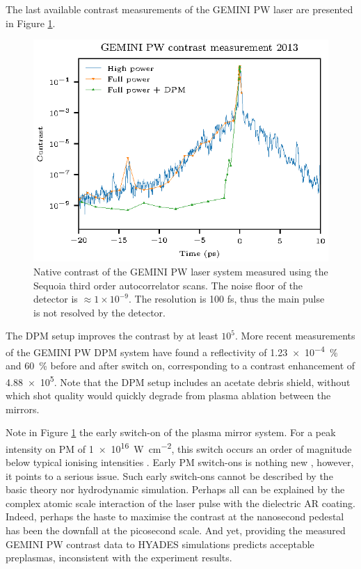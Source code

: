 The last available contrast measurements of the GEMINI PW laser are presented in Figure \ref{fig:geminicontrast}. 
\begin{figure}
	\centering
	\includegraphics{figures/gemini/gemini_contrast}
	\caption[Native contrast of the GEMINI PW laser system.]{Native contrast of the GEMINI PW laser system measured using the Sequoia third order autocorrelator scans. The noise floor of the detector is $\approx 1\times 10^{-9}$. The resolution is 100 fs, thus the main pulse is not resolved by the detector.}
	\label{fig:geminicontrast}
\end{figure}
The \ac{DPM} setup improves the contrast by at least $10^5$. More recent measurements of the GEMINI PW DPM system have found a reflectivity of \qty{1.23e-4}{\%} and \qty{60}{\%} before and after switch on, corresponding to a contrast enhancement of \num{4.88e5}. Note that the DPM setup includes an acetate debris shield, without which shot quality would quickly degrade from plasma ablation between the mirrors.


Note in Figure \ref{fig:geminicontrast} the early switch-on of the plasma mirror system. For a peak intensity on \ac{PM} of \qty{1e16}{W.cm^{-2}}, this switch occurs an order of magnitude below typical ionising intensities \cite{umstadterRelativisticLaserPlasma2003}. Early PM switch-ons is nothing new \cite{caiTimeresolvedMeasurementsReflectivity2009}, however, it points to a serious issue. Such early switch-ons cannot be described by the basic theory nor hydrodynamic simulation. Perhaps all can be explained by the complex atomic scale interaction of the laser pulse with the dielectric AR coating. Indeed, perhaps the haste to maximise the contrast at the nanosecond pedestal has been the downfall at the picosecond scale. And yet, providing the measured GEMINI PW contrast data to HYADES simulations predicts acceptable preplasmas, inconsistent with the experiment results. 

